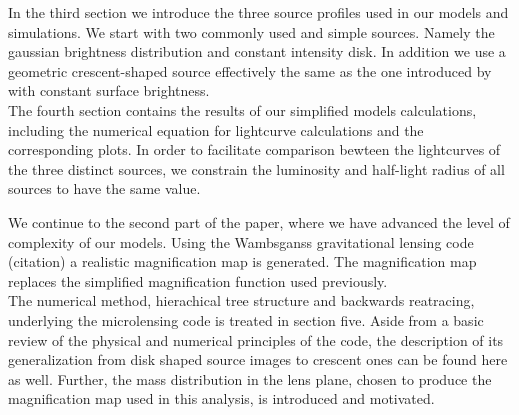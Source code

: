 In the third section we introduce the three source profiles used in our models and simulations. We start with two commonly used and simple sources. Namely the gaussian brightness distribution and constant intensity disk. In addition we use a geometric crescent-shaped source effectively the same as the one introduced by \citep{2013MNRAS.434..765K} with constant surface brightness. \\
The fourth section contains the results of our simplified models calculations, including the numerical equation for lightcurve calculations and the corresponding plots. In order to facilitate comparison bewteen the lightcurves of the three distinct sources, we constrain the luminosity and half-light radius of all sources to have the same value.    
       
We continue to the second part of the paper, where we have advanced the level of complexity of our models. Using the Wambsganss gravitational lensing code (citation) a realistic magnification map is generated. The magnification map replaces the simplified magnification function used previously.  \\
The numerical method, hierachical tree structure and backwards reatracing, underlying the microlensing code is treated in section five. Aside from a basic review of the physical and numerical principles of the code, the description of its generalization from disk shaped source images to crescent ones can be found here as well. Further, the mass distribution in the lens plane, chosen to produce the magnification map used in this analysis, is introduced and motivated.   
